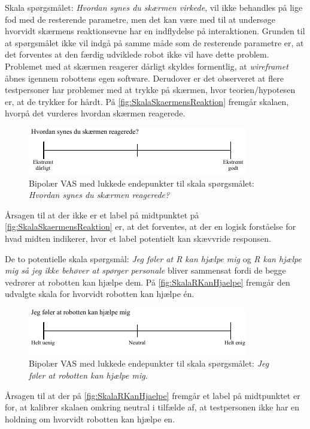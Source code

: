 Skala spørgsmålet: \textit{Hvordan synes du skærmen virkede}, vil ikke behandles på lige fod med de resterende parametre, men det kan være med til at undersøge hvorvidt skærmens reaktionsevne har en indflydelse på interaktionen. Grunden til at spørgsmålet ikke vil indgå på samme måde som de resterende parametre er, at det forventes at den færdig udviklede robot ikke vil have dette problem. Problemet med at skærmen reagerer dårligt skyldes formentlig, at \textit{wireframet} åbnes igennem robottens egen software. Derudover er det observeret at flere testpersoner har problemer med at trykke på skærmen, hvor teorien/hypotesen er, at de trykker for hårdt. På \autoref{fig:SkalaSkaermensReaktion} fremgår skalaen, hvorpå det vurderes hvordan skærmen reagerede.  
%
\begin{figure}[H]
\centering
\includegraphics[width =\textwidth]{Figure/UdvalgteSkalaer/SkaermensReaktion} 
\caption{Bipolær VAS med lukkede endepunkter til skala spørgsmålet: \textit{Hvordan synes du skærmen reagerede?}}
\label{fig:SkalaSkaermensReaktion}
\end{figure}
\noindent
%
Årsagen til at der ikke er et label på midtpunktet på \autoref{fig:SkalaSkaermensReaktion} er, at det forventes, at der en logisk forståelse for hvad midten indikerer, hvor et label potentielt kan skævvride responsen.

De to potentielle skala spørgsmål: \textit{Jeg føler at R kan hjælpe mig} og \textit{R kan hjælpe mig så jeg ikke behøver at spørger personale} bliver sammensat fordi de begge vedrører at robotten kan hjælpe dem. På \autoref{fig:SkalaRKanHjaelpe} fremgår den udvalgte skala for hvorvidt robotten kan hjælpe én.
%
\begin{figure}[H]
\centering
\includegraphics[width =\textwidth]{Figure/UdvalgteSkalaer/RobottenKanHjaelpe} 
\caption{Bipolær VAS med lukkede endepunkter til skala spørgsmålet: \textit{Jeg føler at robotten kan hjælpe mig}.}
\label{fig:SkalaRKanHjaelpe}
\end{figure}
\noindent
%
Årsagen til at der på \autoref{fig:SkalaRKanHjaelpe} fremgår et label på midtpunktet er for, at kalibrer skalaen omkring neutral i tilfælde af, at testpersonen ikke har en holdning om hvorvidt robotten kan hjælpe en. 

